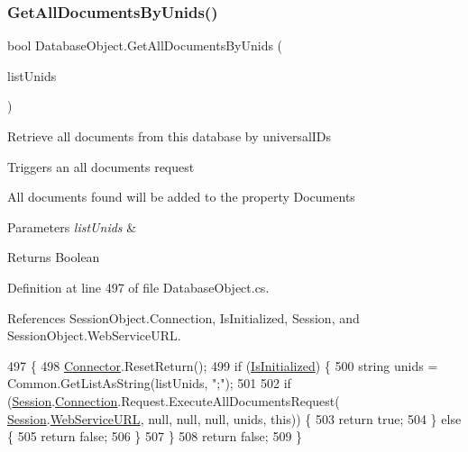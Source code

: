 \subsubsection{\texorpdfstring{Get\+All\+Documents\+By\+Unids()}{GetAllDocumentsByUnids()}\hspace{0.1cm}{\footnotesize\ttfamily [2/2]}}
{\footnotesize\ttfamily bool Database\+Object.\+Get\+All\+Documents\+By\+Unids (\begin{DoxyParamCaption}\item[{I\+List}]{list\+Unids }\end{DoxyParamCaption})}



Retrieve all documents from this database by universal\+I\+Ds 

Triggers an all documents request

All documents found will be added to the property \textquotesingle{}Documents\textquotesingle{}


\begin{DoxyParams}{Parameters}
{\em list\+Unids} & \\
\hline
\end{DoxyParams}
\begin{DoxyReturn}{Returns}
Boolean
\end{DoxyReturn}


Definition at line 497 of file Database\+Object.\+cs.



References Session\+Object.\+Connection, Is\+Initialized, Session, and Session\+Object.\+Web\+Service\+U\+RL.


\begin{DoxyCode}
497                                                         \{
498         \mbox{\hyperlink{class_connector}{Connector}}.ResetReturn();
499         \textcolor{keywordflow}{if} (\mbox{\hyperlink{class_database_object_a5fe036d32a30eb10d1b3f6a30263f740}{IsInitialized}}) \{
500             \textcolor{keywordtype}{string} unids = Common.GetListAsString(listUnids, \textcolor{stringliteral}{";"});
501 
502             \textcolor{keywordflow}{if} (\mbox{\hyperlink{class_database_object_aa8484162b7d2a7c4c9426bca13c64c07}{Session}}.\mbox{\hyperlink{class_session_object_a014bdbf705a753540e19bfb53030c55c}{Connection}}.Request.ExecuteAllDocumentsRequest(
      \mbox{\hyperlink{class_database_object_aa8484162b7d2a7c4c9426bca13c64c07}{Session}}.\mbox{\hyperlink{class_session_object_a697c071c812fbf7ad1166b896fb44c16}{WebServiceURL}}, null, null, null, unids, \textcolor{keyword}{this})) \{
503                 \textcolor{keywordflow}{return} \textcolor{keyword}{true};
504             \} \textcolor{keywordflow}{else} \{
505                 \textcolor{keywordflow}{return} \textcolor{keyword}{false};
506             \}
507         \}
508         \textcolor{keywordflow}{return} \textcolor{keyword}{false};
509     \}
\end{DoxyCode}
\mbox{\label{class_database_object_a9435cc20fe3a92747e509011b7726aff}} 
